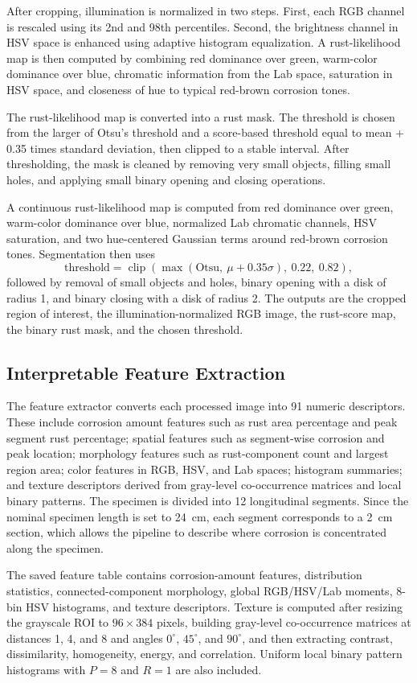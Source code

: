 \documentclass[conference]{IEEEtran}
\begin{document}
After cropping, illumination is normalized in two steps. First, each RGB channel is rescaled using its 2nd and 98th percentiles. Second, the brightness channel in HSV space is enhanced using adaptive histogram equalization. A rust-likelihood map is then computed by combining red dominance over green, warm-color dominance over blue, chromatic information from the Lab space, saturation in HSV space, and closeness of hue to typical red-brown corrosion tones.

The rust-likelihood map is converted into a rust mask. The threshold is chosen from the larger of Otsu's threshold and a score-based threshold equal to mean + 0.35 times standard deviation, then clipped to a stable interval. After thresholding, the mask is cleaned by removing very small objects, filling small holes, and applying small binary opening and closing operations.

A continuous rust-likelihood map is computed from red dominance over green, warm-color dominance over blue, normalized Lab chromatic channels, HSV saturation, and two hue-centered Gaussian terms around red-brown corrosion tones. Segmentation then uses
\[
\text{threshold}=\operatorname{clip}\!\left(\max(\text{Otsu},\ \mu + 0.35\sigma),\ 0.22,\ 0.82\right),
\]
followed by removal of small objects and holes, binary opening with a disk of radius 1, and binary closing with a disk of radius 2. The outputs are the cropped region of interest, the illumination-normalized RGB image, the rust-score map, the binary rust mask, and the chosen threshold.

\subsection{Interpretable Feature Extraction}
The feature extractor converts each processed image into 91 numeric descriptors. These include corrosion amount features such as rust area percentage and peak segment rust percentage; spatial features such as segment-wise corrosion and peak location; morphology features such as rust-component count and largest region area; color features in RGB, HSV, and Lab spaces; histogram summaries; and texture descriptors derived from gray-level co-occurrence matrices and local binary patterns. The specimen is divided into 12 longitudinal segments. Since the nominal specimen length is set to 24~cm, each segment corresponds to a 2~cm section, which allows the pipeline to describe where corrosion is concentrated along the specimen.

The saved feature table contains corrosion-amount features, distribution statistics, connected-component morphology, global RGB/HSV/Lab moments, 8-bin HSV histograms, and texture descriptors. Texture is computed after resizing the grayscale ROI to $96 \times 384$ pixels, building gray-level co-occurrence matrices at distances 1, 4, and 8 and angles $0^\circ$, $45^\circ$, and $90^\circ$, and then extracting contrast, dissimilarity, homogeneity, energy, and correlation. Uniform local binary pattern histograms with $P=8$ and $R=1$ are also included.
\end{document}
